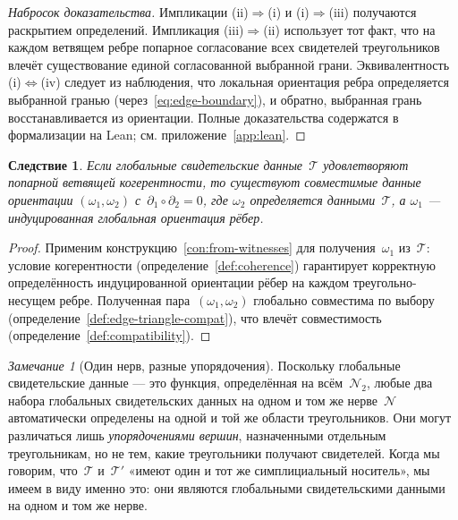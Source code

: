 \documentclass[11pt,a4paper]{article}
\theoremstyle{plain}
\newtheorem{corollary}[theorem]{Следствие}
\theoremstyle{definition}
\theoremstyle{remark}
\newtheorem{remark}[theorem]{Замечание}
\newcommand{\cN}{\mathcal{N}}
\newcommand{\cT}{\mathcal{T}}
\begin{document}
\begin{proof}[Набросок доказательства]
Импликации (ii)$\Rightarrow$(i) и (i)$\Rightarrow$(iii)
получаются раскрытием определений.
Импликация (iii)$\Rightarrow$(ii) использует тот факт, что на каждом
ветвящем ребре попарное согласование всех свидетелей треугольников
влечёт существование единой согласованной выбранной грани.
Эквивалентность (i)$\Leftrightarrow$(iv) следует из наблюдения, что
локальная ориентация ребра определяется выбранной гранью
(через~\eqref{eq:edge-boundary}), и обратно, выбранная грань
восстанавливается из ориентации. Полные доказательства содержатся
в формализации на Lean; см. приложение~\ref{app:lean}.
\end{proof}

\begin{corollary}
\label{cor:coherence-implies-compat}
Если глобальные свидетельские данные~$\cT$ удовлетворяют попарной
ветвящей когерентности, то существуют совместимые данные ориентации
$(\omega_1, \omega_2)$ с~$\partial_1 \circ \partial_2 = 0$, где
$\omega_2$ определяется данными~$\cT$, а $\omega_1$ --- индуцированная
глобальная ориентация рёбер.
\end{corollary}

\begin{proof}
Применим конструкцию~\ref{con:from-witnesses} для получения~$\omega_1$
из~$\cT$: условие когерентности (определение~\ref{def:coherence})
гарантирует корректную определённость индуцированной ориентации рёбер
на каждом треугольно-несущем ребре. Полученная
пара~$(\omega_1, \omega_2)$ глобально совместима по выбору
(определение~\ref{def:edge-triangle-compat}), что влечёт совместимость
(определение~\ref{def:compatibility}).
\end{proof}

\begin{remark}[Один нерв, разные упорядочения]
\label{rem:same-support}
Поскольку глобальные свидетельские данные --- это функция, определённая
на всём~$\cN_2$, любые два набора глобальных свидетельских данных на
одном и том же нерве~$\cN$ автоматически определены на одной и той же
области треугольников.
Они могут различаться лишь \emph{упорядочениями вершин}, назначенными
отдельным треугольникам, но не тем, какие треугольники получают свидетелей.
Когда мы говорим, что~$\cT$ и~$\cT'$ «имеют один и тот же симплициальный
носитель», мы имеем в виду именно это: они являются глобальными
свидетельскими данными на одном и том же нерве.
\end{remark}

\end{document}
